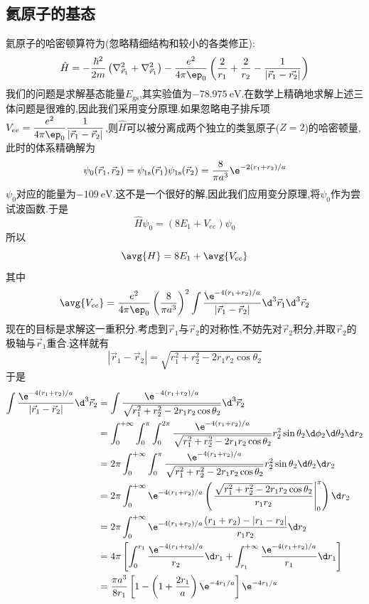 \documentclass{ctexart}
\begin{document}
\subsection{氦原子的基态}
氦原子的哈密顿算符为(忽略精细结构和较小的各类修正):
\[\hat{H}=-\dfrac{\hbar^2}{2m}\left(\nabla_{\vec{r}_1}^2+\nabla_{\vec{r}_1}^2\right)-\dfrac{e^2}{4\pi\ep_0}\left(\dfrac{2}{r_1}+\dfrac{2}{r_2}-\dfrac{1}{\left|\vec{r}_1-\vec{r_2}\right|}\right)\]
我们的问题是求解基态能量$E_{\text{gs}}$,其实验值为$\SI{-78.975}{\electronvolt}$.在数学上精确地求解上述三体问题是很难的,因此我们采用变分原理.如果忽略电子排斥项$V_{ee}=\dfrac{e^2}{4\pi\ep_0}\dfrac{1}{\left|\vec{r}_1-\vec{r}_2\right|}$,则$\hat{H}$可以被分离成两个独立的类氢原子($Z=2$)的哈密顿量,此时的体系精确解为
\[\psi_0(\vec{r}_1,\vec{r}_2)=\psi_{1\text{s}}(\vec{r}_1)\psi_{1\text{s}}(\vec{r}_2)=\dfrac{8}{\pi a^3}\e^{-2(r_1+r_2)/a}\]
$\psi_0$对应的能量为$\SI{-109}{\electronvolt}$.这不是一个很好的解,因此我们应用变分原理,将$\psi_0$作为尝试波函数.于是
\[\hat{H}\psi_0=\left(8E_1+V_{ee}\right)\psi_0\]
所以
\[\avg{H}=8E_1+\avg{V_{ee}}\]
其中
\[\avg{V_{ee}}=\dfrac{e^2}{4\pi\ep_0}\left(\dfrac{8}{\pi a^3}\right)^2\int\dfrac{\e^{-4(r_1+r_2)/a}}{\left|\vec{r}_1-\vec{r}_2\right|}\d^3\vec{r}_1\d^3\vec{r}_2\]
\indent 现在的目标是求解这一重积分.考虑到$\vec{r}_1$与$\vec{r}_2$的对称性,不妨先对$\vec{r}_2$积分,并取$\vec{r}_2$的极轴与$\vec{r}_1$重合.这样就有
\[\left|\vec{r}_1-\vec{r}_2\right|=\sqrt{r_1^2+r_2^2-2r_1r_2\cos\theta_2}\]
于是
\[\begin{aligned}
    \int\dfrac{\e^{-4(r_1+r_2)/a}}{\left|\vec{r}_1-\vec{r}_2\right|}\d^3\vec{r}_2
    &=\int\dfrac{\e^{-4(r_1+r_2)/a}}{\sqrt{r_1^2+r_2^2-2r_1r_2\cos\theta_2}}\d^3\vec{r}_2\\
    &=\int_0^{+\infty}\int_0^{\pi}\int_0^{2\pi}\dfrac{\e^{-4(r_1+r_2)/a}}{\sqrt{r_1^2+r_2^2-2r_1r_2\cos\theta_2}}r_2^2\sin\theta_2\d\phi_2\d\theta_2\d r_2\\
    &=2\pi\int_0^{+\infty}\int_0^{\pi}\dfrac{\e^{-4(r_1+r_2)/a}}{\sqrt{r_1^2+r_2^2-2r_1r_2\cos\theta_2}}r_2^2\sin\theta_2\d\theta_2\d r_2\\
    &=2\pi\int_0^{+\infty}\e^{-4(r_1+r_2)/a}\left(\left.\dfrac{\sqrt{r_1^2+r_2^2-2r_1r_2\cos\theta_2}}{r_1r_2}\right|_0^\pi\right)\d r_2\\
    &=2\pi\int_0^{+\infty}\e^{-4(r_1+r_2)/a}\dfrac{(r_1+r_2)-\left|r_1-r_2\right|}{r_1r_2}\d r_2\\
    &=4\pi\left[\int_0^{r_1}\dfrac{\e^{-4(r_1+r_2)/a}}{r_2}\d r_1+\int_{r_1}^{+\infty}\dfrac{\e^{-4(r_1+r_2)/a}}{r_1}\d r_1\right]\\
    &=\dfrac{\pi a^3}{8r_1}\left[1-\left(1+\dfrac{2r_1}{a}\right)\e^{-4r_1/a}\right]\e^{-4r_1/a}
\end{aligned}\]
\end{document}
